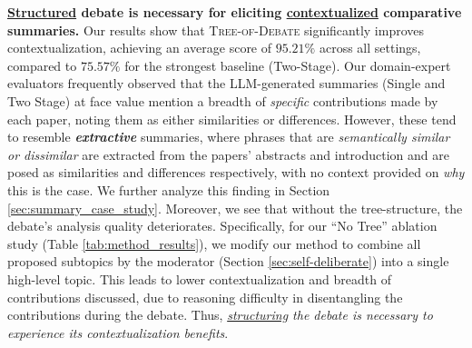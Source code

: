\par{\textbf{\underline{Structured} debate is necessary for eliciting \underline{contextualized} comparative summaries.}} Our results show that \textsc{Tree-of-Debate} significantly improves contextualization, achieving an average score of $95.21\%$ across all settings, compared to $75.57\%$ for the strongest baseline (Two-Stage). Our domain-expert evaluators frequently observed that the LLM-generated summaries (Single and Two Stage) at face value mention a breadth of \textit{specific} contributions made by each paper, noting them as either similarities or differences. However, these tend to resemble \textit{\textbf{extractive}} summaries, where phrases that are \textit{semantically similar or dissimilar} are extracted from the papers' abstracts and introduction and are posed as similarities and differences respectively, with no context provided on \textit{why} this is the case. We further analyze this finding in Section \ref{sec:summary_case_study}. Moreover, we see that without the tree-structure, the debate's analysis quality deteriorates. Specifically, for our ``No Tree'' ablation study (Table \ref{tab:method_results}), we modify our method to combine all proposed subtopics by the moderator (Section \ref{sec:self-deliberate}) into a single high-level topic. This leads to lower contextualization and breadth of contributions discussed, due to reasoning difficulty in disentangling the contributions during the debate. Thus, \textit{\underline{structuring} the debate is necessary to experience its contextualization benefits}.

